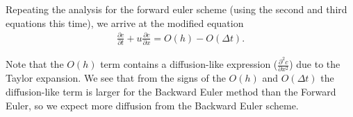 \documentclass{article}
\begin{document}
Repeating the analysis for the forward euler scheme (using the second and third equations this time), we arrive at the modified equation
\begin{align}
    \frac{\partial c}{\partial t} + u \frac{\partial c}{\partial x} = O(h) - O(\Delta t).
\end{align}

Note that the $O(h)$ term contains a diffusion-like expression ($\frac{\partial^2 c}{\partial x^2}$) due to the Taylor expansion.
We see that from the signs of the $O(h)$ and $O(\Delta t)$ the diffusion-like term is larger for the Backward Euler method than the Forward Euler, so we expect more diffusion from the Backward Euler scheme.

% 
\end{document}
